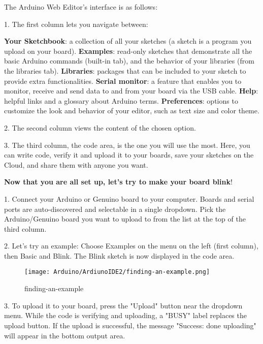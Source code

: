 The Arduino Web Editor’s interface is as follows:

1. The first column lets you navigate between:

\textbf{Your Sketchbook}: a collection of all your sketches (a sketch is a program you upload on your board). \newline
\textbf{Examples}: read-only sketches that demonstrate all the basic Arduino commands (built-in tab), and the behavior of your libraries (from the libraries tab). \newline
\textbf{Libraries}: packages that can be included to your sketch to provide extra functionalities. \newline
\textbf{Serial monitor}: a feature that enables you to monitor, receive and send data to and from your board via the USB cable. \newline
\textbf{Help}: helpful links and a glossary about Arduino terms. \newline
\textbf{Preferences}: options to customize the look and behavior of your editor, such as text size and color theme.
\newline

2. The second column views the content of the chosen option.

3. The third column, the code area, is the one you will use the most. Here, you can write code, verify it and upload it to your boards, save your sketches on the Cloud, and share them with anyone you want.

\textbf{Now that you are all set up, let’s try to make your board blink}!

1. Connect your Arduino or Genuino board to your computer. Boards and serial ports are auto-discovered and selectable in a single dropdown. Pick the Arduino/Genuino board you want to upload to from the list at the top of the third column.

2. Let’s try an example: Choose Examples on the menu on the left (first column), then Basic and Blink. The Blink sketch is now displayed in the code area. 

\begin{figure}
    \begin{center}
        \texttt{[image: Arduino/ArdiunoIDE2/finding-an-example.png]}
        \caption{finding-an-example}
        \label{finding-an-example}
    \end{center}
\end{figure}

3. To upload it to your board, press the "Upload" button near the dropdown menu. While the code is verifying and uploading, a "BUSY" label replaces the upload button. If the upload is successful, the message "Success: done uploading" will appear in the bottom output area.


